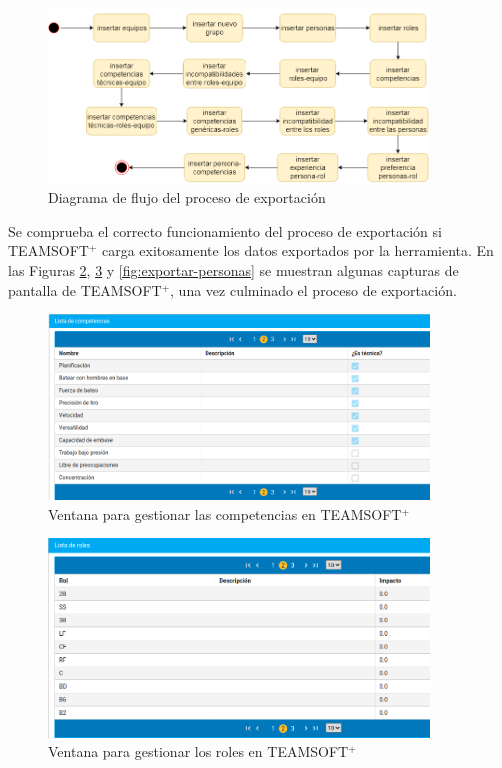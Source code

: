 \begin{figure}[H]
	\centering
	\includegraphics[width=0.9\textwidth]{figuras/flujoCompletoExport.png}
	\caption{Diagrama de flujo del proceso de exportación}\label{fig:flujo-completo}
\end{figure}

Se comprueba el correcto funcionamiento del proceso de exportación si TEAMSOFT$^+$ carga exitosamente los datos exportados por la herramienta. En las Figuras \ref{fig:exportar-competencias}, \ref{fig:exportar-roles} y \ref{fig:exportar-personas} se muestran algunas capturas de pantalla de TEAMSOFT$^+$, una vez culminado el proceso de exportación.

\begin{figure}[H]
	\centering
	\includegraphics[width=0.9\textwidth]{figuras/exportarCompetencias.png}
	\caption{Ventana para gestionar las competencias en TEAMSOFT$^+$}\label{fig:exportar-competencias}
\end{figure}

\begin{figure}[H]
	\centering
	\includegraphics[width=0.9\textwidth]{figuras/exportarRoles.png}
	\caption{Ventana para gestionar los roles en TEAMSOFT$^+$}\label{fig:exportar-roles}
\end{figure}

